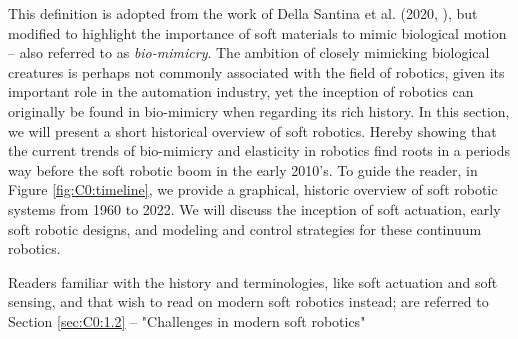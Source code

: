 %
%
This definition is adopted from the work of Della Santina et al. (2020, \cite{DellaSantina2020Springer}), but modified to highlight the importance of soft materials to mimic biological motion -- also referred to as \emph{bio-mimicry}. The ambition of closely mimicking biological creatures is perhaps not commonly associated with the field of robotics, given its important role in the automation industry, yet the inception of robotics can originally be found in bio-mimicry when regarding its rich history. In this section, we will present a short historical overview of soft robotics. Hereby showing that the current trends of bio-mimicry and elasticity in robotics find roots in a periods way before the soft robotic boom in the early 2010's. To guide the reader, in Figure \ref{fig:C0:timeline}, we provide a graphical, historic overview of soft robotic systems from 1960 to 2022. We will discuss the inception of soft actuation, early soft robotic designs, and modeling and control strategies for these continuum robotics.

\begin{rmk}
Readers familiar with the history and terminologies,  like soft actuation and soft sensing, and that wish to read on modern soft robotics instead; are referred to Section \ref{sec:C0:1.2} -- "Challenges in modern soft robotics"
\end{rmk}

